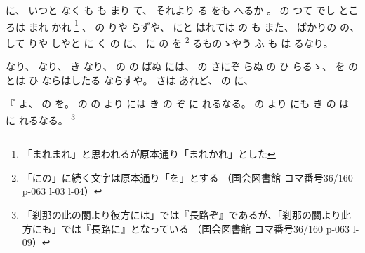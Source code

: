 に、
%
いつと
なく
も%
も%
まり
て、
%
それより
る
をも
へるか
。
%
%
の
つて
でし
ところは
まれ
かれ
\footnote{「まれまれ」と思われるが原本通り「まれかれ」とした}
、
%
の
りや
らずや、
%
にと
はれては
の
も
また、
%
ばかりの
の、
%
して
りや
しやと
に
く
の
に、
%
に
の
を
\footnote{「にの」に続く文字は原本通り「を」とする
（国会図書館 コマ番号36/160 p-063 l-03 l-04）}%
るものゝやう%
ふ
も%
は
るなり。

%
なり、
%
なり、
%
き
なり、
%
の
の
ばぬ
には、
%
の
さにぞ
らぬ
の
ひ
らるゝ、%
%
を
の
とは
ひ
ならはしたる
ならすや。
%
さは
あれど、
%
の
に、

%
『
よ、
%
の
を。
%
の
の
より
には
き
の
ぞ%
に
れるなる。
%
の
より
にも%
き
の
は
%
に
れるなる。
\footnote{「刹那の此の關より彼方には」では『長路ぞ』であるが、「刹那の關より此方にも」では『長路に』となっている
（国会図書館 コマ番号36/160 p-063 l-09）}%

